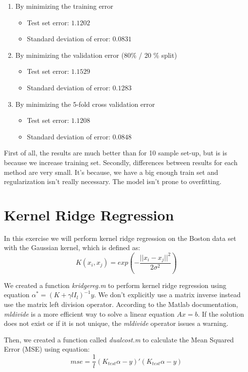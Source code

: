 \documentclass{article} %
\begin{document}
\begin{enumerate}
\item By minimizing the training error
\begin{itemize}
\item Test set error: $1.1202$
\item Standard deviation of error: $0.0831$
\end{itemize}
\item By minimizing the validation error (80\% / 20 \% split)
\begin{itemize}
\item Test set error: $ 1.1529$
\item Standard deviation of error: $ 0.1283$
\end{itemize}
\item By minimizing the 5-fold cross validation error
\begin{itemize}
\item Test set error: $1.1208$
\item Standard deviation of error: $0.0848$
\end{itemize}
\end{enumerate}
First of all, the results are much better than for 10 sample set-up, but is is because we increase training set. Secondly,  differences between results for each method are very small. It's because, we have a big enough train set and regularization isn't really necessary. The model isn't prone to overfitting. 

\section{Kernel Ridge Regression}
In this exercise we will perform kernel ridge regression on the Boston data set with the Gaussian kernel, which is defined as:
\begin{equation}
K(x_i,x_j) = exp(-\frac{|| x_i - x_j||^2}{2 \sigma^2})
\end{equation}

We created a function \textit{kridgereg.m} to perform kernel ridge regression using equation $\alpha^* = (K + \gamma l I_l)^{-1}y$. We don't explicitly use a matrix inverse instead use the matrix left division operator. According to the Matlab documentation, \textit{mldivide} is a more efficient way to solve a linear equation $Ax = b$. If the solution does not exist or if it is not unique, the  \textit{mldivide} operator issues a warning.

Then, we created a function called \textit{dualcost.m} to calculate the Mean Squared Error (MSE) using equation:
\begin{equation}
mse = \frac{1}{l}(K_{test} \alpha - y)'(K_{test} \alpha - y)
\end{equation}
\end{document}
